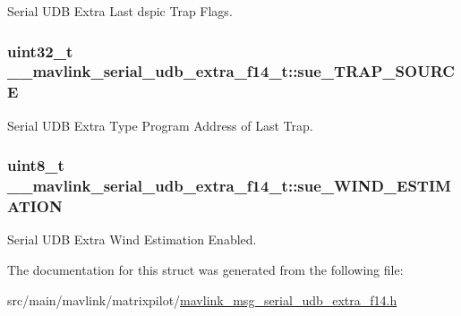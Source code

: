 Serial U\+D\+B Extra Last dspic Trap Flags. 

\hypertarget{struct____mavlink__serial__udb__extra__f14__t_a08b368f934a8f7f9e973e33bd94d6ef1}{
\subsubsection[{sue\+\_\+\+T\+R\+A\+P\+\_\+\+S\+O\+U\+R\+C\+E}]{\setlength{\rightskip}{0pt plus 5cm}uint32\+\_\+t \+\_\+\+\_\+mavlink\+\_\+serial\+\_\+udb\+\_\+extra\+\_\+f14\+\_\+t\+::sue\+\_\+\+T\+R\+A\+P\+\_\+\+S\+O\+U\+R\+C\+E}}\label{struct____mavlink__serial__udb__extra__f14__t_a08b368f934a8f7f9e973e33bd94d6ef1}


Serial U\+D\+B Extra Type Program Address of Last Trap. 

\hypertarget{struct____mavlink__serial__udb__extra__f14__t_a9cead9d7011390113399f7a74e6eb37a}{
\subsubsection[{sue\+\_\+\+W\+I\+N\+D\+\_\+\+E\+S\+T\+I\+M\+A\+T\+I\+O\+N}]{\setlength{\rightskip}{0pt plus 5cm}uint8\+\_\+t \+\_\+\+\_\+mavlink\+\_\+serial\+\_\+udb\+\_\+extra\+\_\+f14\+\_\+t\+::sue\+\_\+\+W\+I\+N\+D\+\_\+\+E\+S\+T\+I\+M\+A\+T\+I\+O\+N}}\label{struct____mavlink__serial__udb__extra__f14__t_a9cead9d7011390113399f7a74e6eb37a}


Serial U\+D\+B Extra Wind Estimation Enabled. 



The documentation for this struct was generated from the following file\+:\begin{DoxyCompactItemize}
\item 
src/main/mavlink/matrixpilot/\hyperlink{mavlink__msg__serial__udb__extra__f14_8h}{mavlink\+\_\+msg\+\_\+serial\+\_\+udb\+\_\+extra\+\_\+f14.\+h}\end{DoxyCompactItemize}
